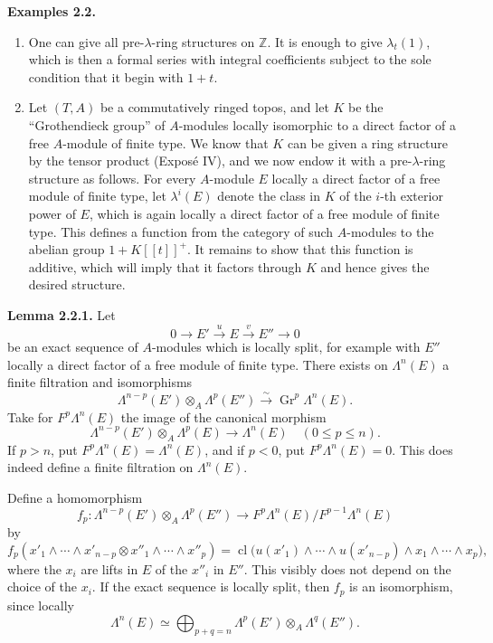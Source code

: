 \documentclass[11pt]{article}
\begin{document}
\textbf{Examples 2.2.}
\begin{enumerate}[label=\alph*)]
\item One can give all pre-\(\lambda\)-ring structures on \(\mathbb Z\). It is enough to give \(\lambda_t(1)\), which is then a formal series with integral coefficients subject to the sole condition that it begin with \(1+t\).

\item Let \((T,A)\) be a commutatively ringed topos, and let \(K\) be the ``Grothendieck group'' of \(A\)-modules locally isomorphic to a direct factor of a free \(A\)-module of finite type. We know that \(K\) can be given a ring structure by the tensor product (Exposé IV), and we now endow it with a pre-\(\lambda\)-ring structure as follows. For every \(A\)-module \(E\) locally a direct factor of a free module of finite type, let \(\lambda^i(E)\) denote the class in \(K\) of the \(i\)-th exterior power of \(E\), which is again locally a direct factor of a free module of finite type. This defines a function from the category of such \(A\)-modules to the abelian group \(1+K[[t]]^+\). It remains to show that this function is additive, which will imply that it factors through \(K\) and hence gives the desired structure.
\end{enumerate}

\textbf{Lemma 2.2.1.} Let
\[
  0\longrightarrow E' \xrightarrow{u} E \xrightarrow{v} E''\longrightarrow 0
\]
be an exact sequence of \(A\)-modules which is locally split, for example with \(E''\) locally a direct factor of a free module of finite type. There exists on \(\Lambda^n(E)\) a finite filtration and isomorphisms
\[
  \Lambda^{n-p}(E')\otimes_A\Lambda^p(E'')
  \xrightarrow{\sim}
  \operatorname{Gr}^p\Lambda^n(E).
\]
Take for \(F^p\Lambda^n(E)\) the image of the canonical morphism
\[
  \Lambda^{n-p}(E')\otimes_A\Lambda^p(E)\longrightarrow \Lambda^n(E)
  \quad (0\leq p\leq n).
\]
If \(p>n\), put \(F^p\Lambda^n(E)=\Lambda^n(E)\), and if \(p<0\), put \(F^p\Lambda^n(E)=0\). This does indeed define a finite filtration on \(\Lambda^n(E)\).

Define a homomorphism
\[
  f_p:\Lambda^{n-p}(E')\otimes_A\Lambda^p(E'')
  \longrightarrow
  F^p\Lambda^n(E)/F^{p-1}\Lambda^n(E)
\]
by
\[
  f_p(x'_1\wedge\cdots\wedge x'_{n-p}\otimes x''_1\wedge\cdots\wedge x''_p)
  =
  \operatorname{cl}\bigl(u(x'_1)\wedge\cdots\wedge u(x'_{n-p})\wedge
  x_1\wedge\cdots\wedge x_p\bigr),
\]
where the \(x_i\) are lifts in \(E\) of the \(x''_i\) in \(E''\). This visibly does not depend on the choice of the \(x_i\). If the exact sequence is locally split, then \(f_p\) is an isomorphism, since locally
\[
  \Lambda^n(E)\simeq\bigoplus_{p+q=n}
  \Lambda^p(E')\otimes_A\Lambda^q(E'').
\]
\end{document}
